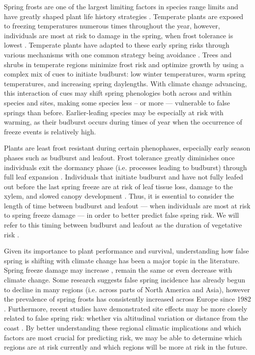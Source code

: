 \documentclass{article}\usepackage[]{graphicx}\usepackage[]{color}
\begin{document}
Spring frosts are one of the largest limiting factors in species range limits and have greatly shaped plant life history strategies \citep{Kollas2014}. Temperate plants are exposed to freezing temperatures numerous times throughout the year, however, individuals are most at risk to damage in the spring, when frost tolerance is lowest \citep{Sakai1987}. Temperate plants have adapted to these early spring risks through various mechanisms with one common strategy being avoidance \citep{Vitasse2014}. %
Trees and shrubs in temperate regions minimize frost risk and optimize growth by using a complex mix of cues to initiate budburst: low winter temperatures, warm spring temperatures, and increasing spring daylengths. With climate change advancing, this interaction of cues may shift spring phenologies both across and within species and sites, making some species less -- or more --- vulnerable to false springs than before. Earlier-leafing species may be especially at risk with warming, as their budburst occurs during times of year when the occurrence of freeze events is relatively high.
 
Plants are least frost resistant during certain phenophases, especially early season phases such as budburst and leafout. Frost tolerance greatly diminishes once individuals exit the dormancy phase (i.e. processes leading to budburst) through full leaf expansion \citep{Lenz2016, Vitasse2014}. Individuals that initiate budburst and have not fully leafed out before the last spring freeze are at risk of leaf tissue loss, damage to the xylem, and slowed canopy development \citep{Gu2008, Hufkens2012}. Thus, it is essential to consider the length of time between budburst and leafout --- when individuals are most at risk to spring freeze damage \citep{Lenz2016} --- in order to better predict false spring risk. We will refer to this timing between budburst and leafout as the duration of vegetative risk \citep{Chamberlain2019}.

Given its importance to plant performance and survival, understanding how false spring is shifting with climate change has been a major topic in the literature. Spring freeze damage may increase \citep{Augspurger2013, Hannenin1991, Labe2016}, remain the same \citep{Scheifinger2003} or even decrease \citep{Kramer1994, Vitra2017} with climate change.%
Some research suggests false spring incidence has already begun to decline in many regions (i.e. across parts of North America and Asia), however the prevalence of spring frosts has consistently increased across Europe since 1982 \citep{Liu2018}. Furthermore, recent studies have demonstrated site effects may be more closely related to false spring risk: whether via altitudinal variation \citep{Ma2018, Vitasse2018, Vitra2017} or distance from the coast \citep{ Ma2018, Wypych2016a}. By better understanding these regional climatic implications and which factors are most crucial for predicting risk, we may be able to determine which regions are at risk currently and which regions will be more at risk in the future.
\end{document}
